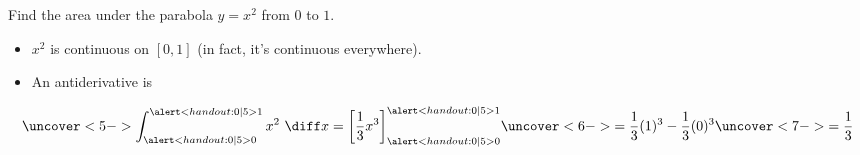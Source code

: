 \begin{frame}
\begin{example}[Example 6, p. 319]
Find the area under the parabola $y = x^2$ from $0$ to $1$.
\begin{itemize}
\item<2->  $x^2$ is continuous on $[0, 1]$ (in fact, it's continuous everywhere).
\item<3-| alert@3-4>  An antiderivative is 
\end{itemize}
\[
\uncover<5->{%
\int_{\alert<handout:0| 5>{0}}^{\alert<handout:0| 5>{1}} x^2 \ \diff x = \left[ \frac{1}{3}x^3\right]_{\alert<handout:0| 5>{0}}^{\alert<handout:0| 5>{1}} %
}%
\uncover<6->{%
 = \frac{1}{3}(1)^3 - \frac{1}{3}(0)^3 %
}%
\uncover<7->{%
 = \frac{1}{3}%
}%
\]
\end{example}
\end{frame}
